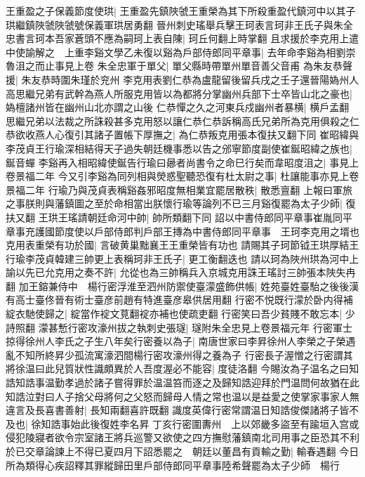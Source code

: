 王重盈之子保義節度使珙|{
	王重盈先鎮陜虢王重榮為其下所殺重盈代鎮河中以其子珙繼鎮陜虢陜虢號保義軍珙居勇翻}
晉州刺史瑤舉兵擊王珂表言珂非王氏子與朱全忠書言珂本吾家蒼頭不應為嗣珂上表自陳|{
	珂丘何翻上時掌翻}
且求援於李克用上遣中使諭解之　上重李谿文學乙未復以谿為戶部侍郎同平章事|{
	去年命李谿為相劉崇魯沮之而止事見上卷}
朱全忠軍于單父|{
	單父縣時帶單州單音善父音甫}
為朱友恭聲援|{
	朱友恭時圍朱瑾於兖州}
李克用表劉仁恭為盧龍留後留兵戌之壬子還晉陽媯州人高思繼兄弟有武幹為燕人所服克用皆以為都將分掌幽州兵部下士卒皆山北之豪也|{
	媯檀諸州皆在幽州山北亦謂之山後}
仁恭憚之久之河東兵戍幽州者暴横|{
	横戶孟翻}
思繼兄弟以法裁之所誅殺甚多克用怒以讓仁恭仁恭訴稱高氏兄弟所為克用俱殺之仁恭欲收燕人心復引其諸子置帳下厚撫之|{
	為仁恭叛克用張本復扶又翻下同}
崔昭緯與李茂貞王行瑜深相結得天子過失朝廷機事悉以告之邠寧節度副使崔鋋昭緯之族也|{
	鋋音蟬}
李谿再入相昭緯使鋋告行瑜曰曏者尚書令之命巳行矣而韋昭度沮之|{
	事見上卷景福二年}
今又引李谿為同列相與熒惑聖聽恐復有杜太尉之事|{
	杜讓能事亦見上卷景福二年}
行瑜乃與茂貞表稱谿姦邪昭度無相業宜罷居散秩|{
	散悉亶翻}
上報曰軍旅之事朕則與藩鎮圖之至於命相當出朕懷行瑜等論列不已三月谿復罷為太子少師|{
	復扶又翻}
王珙王瑤請朝廷命河中帥|{
	帥所類翻下同}
詔以中書侍郎同平章事崔胤同平章事充護國節度使以戶部侍郎判戶部王摶為中書侍郎同平章事　王珂李克用之壻也克用表重榮有功於國|{
	言破黄巢黜襄王王重榮皆有功也}
請賜其子珂節钺王珙厚結王行瑜李茂貞韓建三帥更上表稱珂非王氏子|{
	更工衡翻迭也}
請以珂為陜州珙為河中上諭以先已允克用之奏不許|{
	允從也為三帥稱兵入京城克用誅王瑤討三帥張本陜失冉翻}
加王鎔兼侍中　楊行密浮淮至泗州防禦使臺濛盛飾供帳|{
	姓苑臺姓臺駘之後後漢有高士臺佟晉有術士臺彦前趙有特進臺彦皋供居用翻}
行密不悦既行濛於卧内得補綻衣馳使歸之|{
	綻當作䘺文莧翻䘺亦補也使疏吏翻}
行密笑曰吾少貧賤不敢忘本|{
	少詩照翻}
濛甚慙行密攻濠州拔之執刺史張璲|{
	璲附朱全忠見上卷景福元年}
行密軍士掠得徐州人李氏之子生八年矣行密養以為子|{
	南唐世家曰李昇徐州人李榮之子榮遇亂不知所終昇少孤流寓濠泗間楊行密攻濠州得之養為子}
行密長子渥憎之行密謂其將徐温曰此兒質狀性識頗異於人吾度渥必不能容|{
	度徒洛翻}
今賜汝為子温名之曰知誥知誥事温勤孝過於諸子嘗得罪於温温笞而逐之及歸知誥迎拜於門温問何故猶在此知誥泣對曰人子捨父母將何之父怒而歸母人情之常也温以是益愛之使掌家事家人無違言及長喜書善射|{
	長知兩翻喜許既翻}
識度英偉行密常謂温日知誥俊傑諸將子皆不及也|{
	徐知誥事始此後復姓李名昇}
丁亥行密圍夀州　上以郊畿多盜至有踰垣入宫或侵犯陵寢者欲令宗室諸王將兵巡警又欲使之四方撫慰藩鎮南北司用事之臣恐其不利於已交章論諫上不得已夏四月下詔悉罷之　朝廷以董昌有貢輸之勤|{
	輸春遇翻}
今日所為類得心疾詔釋其罪縱歸田里戶部侍郎同平章事陸希聲罷為太子少師　楊行

